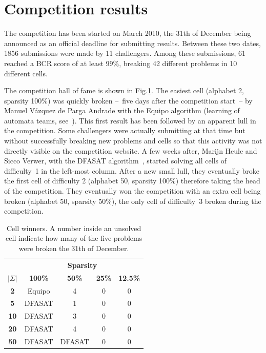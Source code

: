 
\section{Competition results\label{section:stamina-results}}

The competition has been started on March 2010, the 31th of December being announced as an official deadline for submitting results. Between these two dates, 1856 submissions were made by 11 challengers. Among these submissions, 61 reached a BCR score of at least 99\%, breaking 42 different problems in 10 different cells.

The competition hall of fame is shown in Fig.\ref{stamina:table:hall-of-fame}. The easiest cell (alphabet 2, sparsity 100\%) was quickly broken --~five days after the competition start~-- by Manuel V\'azquez de Parga Andrade with the Equipo algorithm (learning of automata teams, see~\cite{Garcia:2010}). This first result has been followed by an apparent lull in the competition. Some challengers were actually submitting at that time but without successfully breaking new problems and cells so that this activity was not directly visible on the competition website. A few weeks after, Marijn Heule and Sicco Verwer, with the DFASAT algorithm~\cite{Heule10}, started solving all cells of difficulty~1 in the left-most column. After a new small lull, they eventually broke the first cell of difficulty 2 (alphabet 50, sparsity 100\%) therefore taking the head of the competition. They eventually won the competition with an extra cell being broken (alphabet 50, sparsity 50\%), the only cell of difficulty~3 broken during the competition.

\begin{table}[H]
\begin{center}
\begin{tabular}{c|c c c c}
&\multicolumn{4}{|c}{\textbf{Sparsity}}\\ 
\textbf{$|\Sigma|$} & \textbf{100\%} & \textbf{50\%} & \textbf{25\%} & \textbf{12.5\%}\\
\hline
\textbf{2}  & Equipo & 4 & 0 & 0 \\
\textbf{5}  & DFASAT & 1 & 0 & 0 \\
\textbf{10} & DFASAT & 3 & 0 & 0 \\
\textbf{20} & DFASAT & 4 & 0 & 0 \\
\textbf{50} & DFASAT & DFASAT & 0 & 0 \\
\end{tabular}
\end{center}
\caption{Cell winners. A number inside an unsolved cell indicate how many of the five problems were broken the 31th of December.\label{stamina:table:hall-of-fame}}
\end{table}

